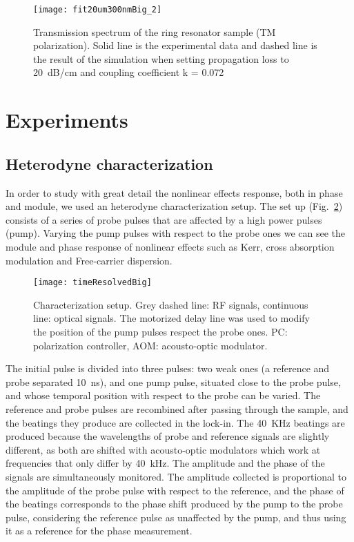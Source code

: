 \begin{figure}[htb]
    \centering
    \texttt{[image: fit20um300nmBig\_2]}   
    \caption{Transmission spectrum of the ring resonator sample (TM polarization). Solid line is the experimental data and dashed line is the result of the simulation when setting propagation loss to 20~dB/cm and coupling coefficient k = 0.072}
    \label{fig:fit20um300nmBig}
\end{figure}


\section{Experiments}

\subsection{Heterodyne characterization}
In order to study with great detail the nonlinear effects response, both in phase and module, we used an heterodyne characterization setup. The set up (Fig.~\ref{fig:timeResSetupSwitching}) consists of a series of probe pulses that are affected by a high power pulses (pump). Varying the pump pulses with respect to the probe ones we can see the module and phase response of nonlinear effects such as Kerr, cross absorption modulation and Free-carrier dispersion.


\begin{figure}[htb]
    \centering
    \texttt{[image: timeResolvedBig]}
    \caption{Characterization setup. Grey dashed line: RF signals, continuous line: optical signals. The motorized delay line was used to modify the position of the pump pulses respect the probe ones. PC: polarization controller, AOM: acousto-optic modulator.}
    \label{fig:timeResSetupSwitching}
\end{figure}


The initial pulse is divided into three pulses: two weak ones (a reference and probe separated 10~ns), and one pump pulse, situated close to the probe pulse, and whose temporal position with respect to the probe can be varied. The reference and probe pulses are recombined after passing through the sample, and the beatings they produce are collected in the lock-in. The 40~KHz beatings  are produced because the wavelengths of probe and reference signals are slightly different, as both are shifted with acousto-optic modulators which work at frequencies that only differ by 40~kHz. The amplitude and the phase of the signals are simultaneously monitored.
The amplitude collected is proportional to the amplitude of the probe pulse with respect to the reference, and the phase of the beatings corresponds to the phase shift produced by the pump to the probe pulse, considering the reference pulse as unaffected by the pump, and thus using it as a reference for the phase measurement. 


